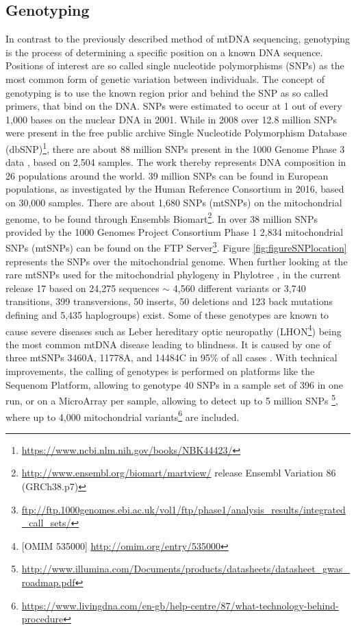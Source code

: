 \subsection{Genotyping}
In contrast to the previously described method of mtDNA sequencing, genotyping is the process of determining a specific position on a known DNA sequence. Positions of interest are so called single nucleotide polymorphisms (SNPs) as the most common form of genetic variation between individuals\cite{Perkel2008}. The concept of genotyping is to use the known region prior and behind the SNP as so called primers, that bind on the DNA. SNPs were estimated to occur at 1 out of every 1,000 bases on the nuclear DNA \cite{Syvanen2001} in 2001. While in 2008 over 12.8 million SNPs were present in the free public archive Single Nucleotide Polymorphism Database (dbSNP)\footnote{\url{https://www.ncbi.nlm.nih.gov/books/NBK44423/}}, there are about 88 million SNPs present in the 1000 Genome Phase 3 data \cite{Auton2015}, based on 2,504 samples. The work thereby represents DNA composition in 26 populations around the world. 39 million SNPs can be found in European populations, as investigated by the Human Reference Consortium \cite{McCarthy2016} in 2016, based on 30,000 samples. There are about 1,680 SNPs (mtSNPs) on the mitochondrial genome, to be found through Ensembls \cite{Flicek2014} Biomart\footnote{\url{http://www.ensembl.org/biomart/martview/} release Ensembl Variation 86 (GRCh38.p7)}. In over 38 million SNPs provided by the 1000 Genomes Project Consortium Phase 1 \cite{Abecasis2012} 2,834 mitochondrial SNPs (mtSNPs) can be found on the FTP Server\footnote{\url{ftp://ftp.1000genomes.ebi.ac.uk/vol1/ftp/phase1/analysis_results/integrated_call_sets/}}. Figure \ref{fig:figureSNPlocation} represents the SNPs over the mitochondrial genome. When further looking at the rare mtSNPs used for the mitochondrial phylogeny in Phylotree \cite{VanOven2009},\cite{VanOven2010} in the current release 17 based on 24,275 sequences $\sim$ 4,560 different variants or 3,740 transitions, 399 transversions, 50 inserts, 50 deletions and 123 back mutations defining and 5,435 haplogroups) exist. Some of these genotypes are known to cause severe diseases such as Leber hereditary optic neuropathy (LHON\footnote{[OMIM 535000] \url{http://omim.org/entry/535000}}) being the most common mtDNA disease leading to blindness. It is caused by one of three mtSNPs 3460A, 11778A, and 14484C in 95\% of all cases \cite{Elson2007}. With technical improvements, the calling of genotypes is performed on platforms like the Sequenom Platform, allowing to genotype 40 SNPs in a sample set of 396 in one run\cite{Weissensteiner2013}, or on a MicroArray per sample, allowing to detect up to 5 million SNPs  \footnote{\url{http://www.illumina.com/Documents/products/datasheets/datasheet_gwas_roadmap.pdf}}, where up to 4,000 mitochondrial variants\footnote{\url{https://www.livingdna.com/en-gb/help-centre/87/what-technology-behind-procedure}} are included.

